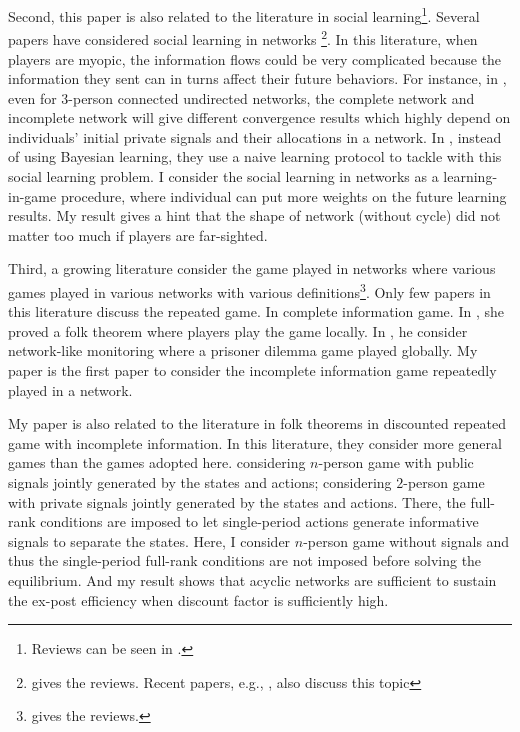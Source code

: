 \documentclass[12pt,letter]{article}
\theoremstyle{definition}
\theoremstyle{remark}
\theoremstyle{claim}
\begin{document}
Second, this paper is also related to the literature in social learning\footnote{Reviews can be seen in \citep{Bikhchandani1998} \citep{Cao2001}.}. Several papers have considered social learning in networks \footnote{\citep{Goyal2012} gives the reviews. Recent papers, e.g., \citep{Acemoglu2011}\citep{Chatterjee2011}, also discuss this topic}. In this literature, when players are myopic, the information flows could be very complicated because the information they sent can in turns affect their future behaviors. For instance, in \citep{RePEc:eee:gamebe:v:45:y:2003:i:2:p:329-346},  even for 3-person connected undirected networks, the complete network and incomplete network will give different convergence results which highly depend on individuals' initial private signals and their allocations in a network. In \citep{Golub2010}, instead of using Bayesian learning, they use a naive learning protocol to tackle with this social learning problem. I consider the social learning in networks as a learning-in-game procedure, where individual can put more weights on the future learning results. My result gives a hint that the shape of network (without cycle) did not matter too much if players are far-sighted.

Third, a growing literature consider the game played in networks where various games played in various networks with various definitions\footnote{\citep{Jackson2008}\citep{Goyal2012} gives the reviews.}. Only few papers in this literature discuss the repeated game. In complete information game. In \citep{Laclau2012}, she proved a folk theorem where players play the game locally. In \citep{Wolitzky2013} \citep{Wolitzky2014}, he consider network-like monitoring where a prisoner dilemma game played globally. My paper is the first paper to consider the incomplete information game repeatedly played in a network. 

My paper is also related to the literature in folk theorems in discounted repeated game with incomplete information. In this literature, they consider more general games than the games adopted here. \citep{Fudenberg2010} \citep{Fudenberg2011} \citep{Wiseman2012} considering $n$-person game with public signals jointly generated by the states and actions; \citep{Yamamoto2014} considering $2$-person game with private signals jointly generated by the states and actions. There, the full-rank conditions are imposed to let single-period actions generate informative signals to separate the states. Here, I consider $n$-person game without signals and thus the single-period full-rank conditions are not imposed before solving the equilibrium.  And my result shows that acyclic networks are sufficient to sustain the ex-post efficiency when discount factor is sufficiently high. 
\end{document}
